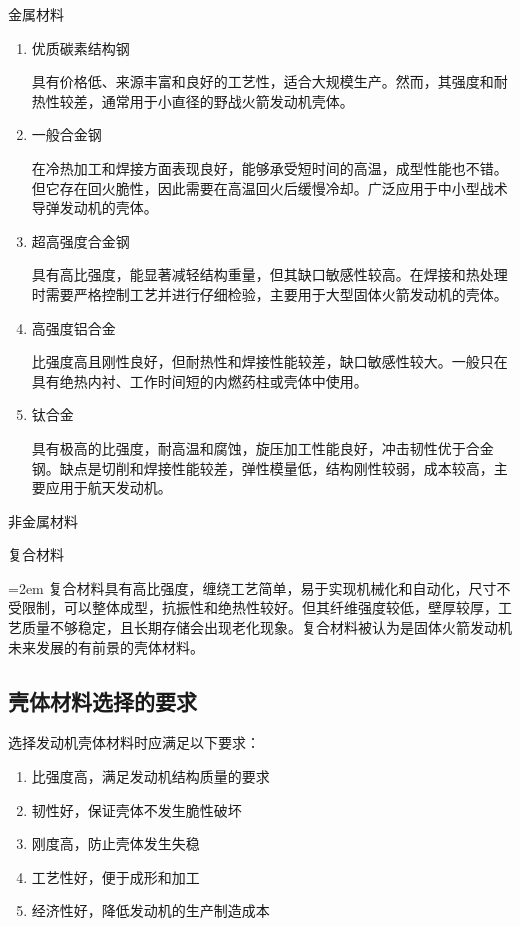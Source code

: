 \noindent 金属材料
\begin{enumerate}[leftmargin=2em]
    \item 优质碳素结构钢
    
    具有价格低、来源丰富和良好的工艺性，适合大规模生产。然而，其强度和耐热性较差，通常用于小直径的野战火箭发动机壳体。

    \item 一般合金钢
    
    在冷热加工和焊接方面表现良好，能够承受短时间的高温，成型性能也不错。但它存在回火脆性，因此需要在高温回火后缓慢冷却。广泛应用于中小型战术导弹发动机的壳体。

    \item 超高强度合金钢
    
    具有高比强度，能显著减轻结构重量，但其缺口敏感性较高。在焊接和热处理时需要严格控制工艺并进行仔细检验，主要用于大型固体火箭发动机的壳体。

    \item 高强度铝合金
    
    比强度高且刚性良好，但耐热性和焊接性能较差，缺口敏感性较大。一般只在具有绝热内衬、工作时间短的内燃药柱或壳体中使用。

    \item 钛合金
    
    具有极高的比强度，耐高温和腐蚀，旋压加工性能良好，冲击韧性优于合金钢。缺点是切削和焊接性能较差，弹性模量低，结构刚性较弱，成本较高，主要应用于航天发动机。

\end{enumerate}

\noindent 非金属材料

复合材料

\hangindent=2em  复合材料具有高比强度，缠绕工艺简单，易于实现机械化和自动化，尺寸不受限制，可以整体成型，抗振性和绝热性较好。但其纤维强度较低，壁厚较厚，工艺质量不够稳定，且长期存储会出现老化现象。复合材料被认为是固体火箭发动机未来发展的有前景的壳体材料。

\subsection{壳体材料选择的要求}

选择发动机壳体材料时应满足以下要求：

\begin{enumerate}[leftmargin=2em]
    \item 比强度高，满足发动机结构质量的要求
    \item 韧性好，保证壳体不发生脆性破坏
    \item 刚度高，防止壳体发生失稳
    \item 工艺性好，便于成形和加工
    \item 经济性好，降低发动机的生产制造成本
\end{enumerate}

